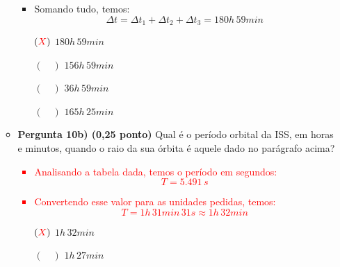 \documentclass[a4paper, 12pt]{article}
\newcommand{\red}[1]{\textcolor{red}{#1}}
\begin{document}
\begin{flushleft}
\begin{itemize}
\begin{itemize}
{\begin{itemize}
                                \begin{equation*}
                                    \Delta t_3=17h \, 12min
                                \end{equation*}
                            \item Somando tudo, temos:
                                \begin{equation*}
                                    \Delta t=\Delta t_1 + \Delta t_2+\Delta t_3=180h \, 59min
                                \end{equation*}
                        \end{itemize}}
                        \begin{itemize}
                            \item[$(\red{X})$] $180h \, 59min$
                            \item[$(\quad)$] $156h \, 59min$
                            \item[$(\quad)$] $36h \, 59min$
                            \item[$(\quad)$] $165h \, 25min$
                        \end{itemize}
                    \item \textbf{Pergunta 10b) (0,25 ponto)} Qual é o período orbital da ISS, em horas e minutos, quando o raio da sua órbita é aquele dado no parágrafo acima?
                        \red{\begin{itemize}
                            \item Analisando a tabela dada, temos o período em segundos:
                                \begin{equation*}
                                    T=5.491 \, s
                                \end{equation*}
                            \item Convertendo esse valor para as unidades pedidas, temos:
                                \begin{equation*}
                                    T=1h \, 31min \, 31s \approx 1h \, 32min
                                \end{equation*}
                        \end{itemize}}
                        \begin{itemize}
                            \item[$(\red{X})$] $1h \, 32min$
                            \item[$(\quad)$] $1h \, 27min$

\end{itemize}
\end{itemize}
\end{itemize}
\end{flushleft}
\end{document}
